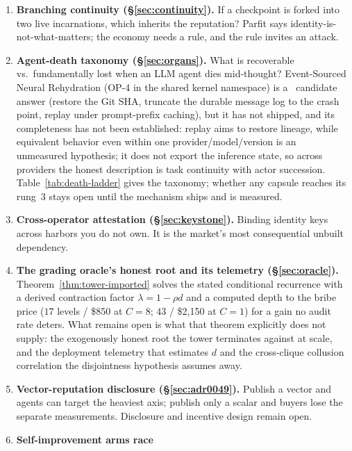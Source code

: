 \documentclass[11pt,a4paper]{article}
\theoremstyle{definition}
\begin{document}
\begin{enumerate}[leftmargin=1.6em]
  \item\label{op:branching} \textbf{Branching continuity (\S\ref{sec:continuity}).}
  If a checkpoint is
  forked into two live incarnations, which inherits the reputation? Parfit says
  identity-is-not-what-matters; the economy needs a rule, and the rule invites an
  attack.
  \item\label{op:death} \textbf{Agent-death taxonomy (\S\ref{sec:organs}).} What is
  recoverable vs.\ fundamentally lost when an LLM agent dies mid-thought?
  Event-Sourced Neural Rehydration (OP-4 in the shared kernel namespace) is a
  \DESIGNED\ candidate answer (restore the Git SHA, truncate the durable message
  log to the crash point, replay under prompt-prefix caching), but it has not
  shipped, and its completeness has not been established: replay aims to restore
  lineage, while equivalent behavior even within one provider/model/version is
  an unmeasured hypothesis;
  it does not export the inference state, so across providers the honest
  description is task continuity with actor succession.
  Table~\ref{tab:death-ladder} gives the taxonomy; whether any capsule reaches
  its rung~3 stays open until the mechanism ships and is measured.
  \item\label{op:attest} \textbf{Cross-operator attestation (\S\ref{sec:keystone}).}
  Binding identity keys across harbors you do not own. It is the market's most
  consequential unbuilt dependency.
  \item\label{op:root} \textbf{The grading oracle's honest root and its telemetry
  (\S\ref{sec:oracle}).} Theorem~\ref{thm:tower-imported} solves the stated
  conditional recurrence with a
  derived contraction factor $\lambda = 1-\rho d$ and a computed depth to the
  bribe price ($17$ levels / \$850 at $C{=}8$; $43$ / \$2{,}150 at $C{=}1$) for
  a gain no audit rate deters. What remains open is what that
  theorem explicitly does not supply: the exogenously honest root the tower
  terminates against at scale, and the deployment telemetry that estimates $d$ and
  the cross-clique collusion correlation the disjointness hypothesis assumes away.
  \item\label{op:disclosure} \textbf{Vector-reputation disclosure
  (\S\ref{sec:adr0049}).} Publish a
  vector and agents can target the heaviest axis; publish only a scalar and
  buyers lose the separate measurements. Disclosure and incentive design
  remain open.
  \item\label{op:armsrace} \textbf{Self-improvement arms race
}
\end{enumerate}
\end{document}
